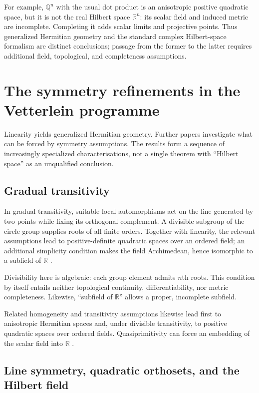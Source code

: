 \documentclass[
  aps,
  pra,
  twocolumn,
  amsmath,
  amssymb,
  longbibliography,
  nofootinbib,
  floatfix
]{revtex4-2}
\begin{document}
For example, $\mathbb Q^n$ with the usual dot product is an anisotropic
positive quadratic space, but it is not the real Hilbert space $\mathbb R^n$:
its scalar field and induced metric are incomplete.  Completing it adds scalar
limits and projective points.  Thus generalized Hermitian geometry and the standard
complex Hilbert-space formalism are distinct conclusions; passage from the
former to the latter requires additional field, topological, and completeness
assumptions.

\section{The symmetry refinements in the Vetterlein programme}
\label{sec:symmetry}

Linearity yields generalized Hermitian geometry.  Further papers investigate
what can be forced by symmetry assumptions.  The results form a sequence of
increasingly specialized characterisations, not a single theorem with
``Hilbert space'' as an unqualified conclusion.

\subsection{Gradual transitivity}

In gradual transitivity, suitable local automorphisms act on the line generated
by two points while fixing its orthogonal complement.  A divisible subgroup of
the circle group supplies roots of all finite orders.  Together with linearity,
the relevant assumptions lead to positive-definite quadratic spaces over an
ordered field; an additional simplicity condition makes the field
Archimedean, hence isomorphic to a subfield of $\mathbb R$
\cite{Vetterlein2021Gradual}.

Divisibility here is algebraic: each group element admits $n$th roots.  This
condition by itself entails neither topological continuity, differentiability,
nor metric completeness.  Likewise, ``subfield of $\mathbb R$'' allows a
proper, incomplete subfield.

Related homogeneity and transitivity assumptions likewise lead first to
anisotropic Hermitian spaces and, under divisible transitivity, to positive
quadratic spaces over ordered fields.  Quasiprimitivity can force an embedding
of the scalar field into $\mathbb R$ \cite{Vetterlein2022Transitivity}.

\subsection{Line symmetry, quadratic orthosets, and the Hilbert field}
\end{document}
